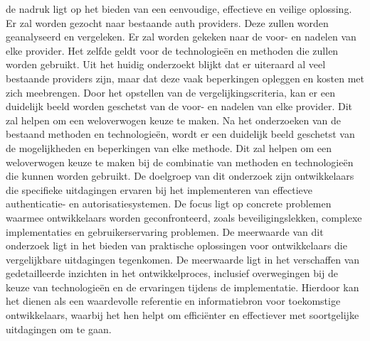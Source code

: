 de nadruk ligt op het bieden van een eenvoudige, effectieve en veilige oplossing.
Er zal worden gezocht naar bestaande auth providers. Deze zullen worden geanalyseerd en vergeleken. Er zal worden gekeken naar de voor- en nadelen van
elke provider. Het zelfde geldt voor de technologieën en methoden die zullen worden gebruikt.
\newline
\newline
Uit het huidig onderzoekt blijkt dat er uiteraard al veel bestaande providers zijn, maar dat deze vaak beperkingen opleggen en kosten met zich meebrengen.
Door het opstellen van de vergelijkingscriteria, kan er een duidelijk beeld worden geschetst van de voor- en nadelen van elke provider. Dit zal helpen
om een weloverwogen keuze te maken. Na het onderzoeken van de bestaand methoden en technologieën, wordt er een duidelijk beeld geschetst van de mogelijkheden
en beperkingen van elke methode. Dit zal helpen om een weloverwogen keuze te maken bij de combinatie van methoden en technologieën die kunnen worden gebruikt.
\newline
\newline
De doelgroep van dit onderzoek zijn ontwikkelaars die specifieke uitdagingen ervaren bij het implementeren van effectieve authenticatie- en 
autorisatiesystemen. De focus ligt op concrete problemen waarmee ontwikkelaars worden geconfronteerd, zoals beveiligingslekken, complexe implementaties 
en gebruikerservaring problemen. 
\newline
\newline
De meerwaarde van dit onderzoek ligt in het bieden van praktische oplossingen voor ontwikkelaars die vergelijkbare uitdagingen tegenkomen. 
De meerwaarde ligt in het verschaffen van gedetailleerde 
inzichten in het ontwikkelproces, inclusief overwegingen bij de keuze van technologieën en de ervaringen tijdens de implementatie. Hierdoor kan het 
dienen als een waardevolle referentie en informatiebron voor toekomstige ontwikkelaars, waarbij het hen helpt om efficiënter en effectiever met 
soortgelijke uitdagingen om te gaan.
